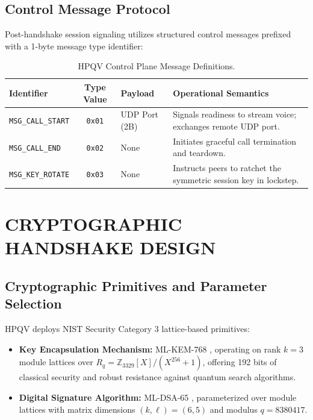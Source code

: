 \subsection{Control Message Protocol}
Post-handshake session signaling utilizes structured control messages prefixed with a 1-byte message type identifier:
\begin{table}[htbp]
    \centering
    \caption{HPQV Control Plane Message Definitions.}
    \label{tab:control_messages}
    \begin{tabularx}{\textwidth}{>{\raggedright\arraybackslash}p{4.2cm} c >{\raggedright\arraybackslash}p{2.5cm} >{\raggedright\arraybackslash}X}
        \toprule
        \textbf{Identifier} & \textbf{Type Value} & \textbf{Payload} & \textbf{Operational Semantics} \\
        \midrule
        \texttt{MSG\_CALL\_START} & \texttt{0x01} & UDP Port (2B) & Signals readiness to stream voice; exchanges remote UDP port. \\
        \texttt{MSG\_CALL\_END} & \texttt{0x02} & None & Initiates graceful call termination and teardown. \\
        \texttt{MSG\_KEY\_ROTATE} & \texttt{0x03} & None & Instructs peers to ratchet the symmetric session key in lockstep. \\
        \bottomrule
    \end{tabularx}
\end{table}

\section{CRYPTOGRAPHIC HANDSHAKE DESIGN}

\subsection{Cryptographic Primitives and Parameter Selection}
HPQV deploys NIST Security Category 3 lattice-based primitives:
\begin{itemize}
    \item \textbf{Key Encapsulation Mechanism:} ML-KEM-768 \cite{nist_fips203}, operating on rank $k=3$ module lattices over $R_q = \mathbb{Z}_{3329}[X]/(X^{256}+1)$, offering 192 bits of classical security and robust resistance against quantum search algorithms.
    \item \textbf{Digital Signature Algorithm:} ML-DSA-65 \cite{nist_fips204}, parameterized over module lattices with matrix dimensions $(k,\ell) = (6,5)$ and modulus $q=8380417$.
\end{itemize}

